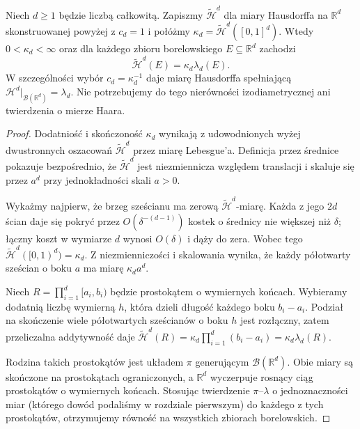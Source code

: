 \begin{twierdzenie}
\label{thm:hausdorff-calibration-26}
Niech $d\ge1$ będzie liczbą całkowitą. Zapiszmy
$\widetilde{\mathcal H}^{d}$ dla miary Hausdorffa
na $\mathbb R^d$ skonstruowanej powyżej z $c_d=1$
i połóżmy $\kappa_d=\widetilde{\mathcal H}^{d}([0,1]^d)$.
Wtedy $0<\kappa_d<\infty$ oraz dla każdego
zbioru borelowskiego $E\subseteq\mathbb R^d$
zachodzi
\[
 \widetilde{\mathcal H}^{d}(E)=\kappa_d\lambda_d(E).
\]
W szczególności wybór $c_d=\kappa_d^{-1}$ daje
miarę Hausdorffa spełniającą
$\mathcal H^d|_{\mathcal B(\mathbb R^d)}=\lambda_d$.
Nie potrzebujemy do tego nierówności izodiametrycznej
ani twierdzenia o mierze Haara.
\end{twierdzenie}
\begin{proof}
Dodatniość i skończoność $\kappa_d$ wynikają z
udowodnionych wyżej dwustronnych oszacowań
$\widetilde{\mathcal H}^{d}$ przez miarę Lebesgue'a.
Definicja przez średnice pokazuje bezpośrednio,
że $\widetilde{\mathcal H}^{d}$ jest niezmiennicza
względem translacji i skaluje się przez $a^d$
przy jednokładności skali $a>0$.

Wykażmy najpierw, że brzeg sześcianu ma zerową
$\widetilde{\mathcal H}^{d}$-miarę.
Każda z jego $2d$ ścian daje się pokryć przez
$O(\delta^{-(d-1)})$ kostek o średnicy nie większej
niż $\delta$; łączny koszt w wymiarze $d$ wynosi
$O(\delta)$ i dąży do zera. Wobec tego
$\widetilde{\mathcal H}^{d}([0,1)^d)=\kappa_d$.
Z niezmienniczości i skalowania wynika, że każdy
półotwarty sześcian o boku $a$ ma miarę
$\kappa_da^d$.

Niech $R=\prod_{i=1}^d[a_i,b_i)$ będzie
prostokątem o wymiernych końcach.
Wybieramy dodatnią liczbę wymierną $h$, która
dzieli długość każdego boku $b_i-a_i$.
Podział na skończenie wiele półotwartych sześcianów
o boku $h$ jest rozłączny, zatem przeliczalna
addytywność daje
$\widetilde{\mathcal H}^{d}(R)
=\kappa_d\prod_{i=1}^d(b_i-a_i)
=\kappa_d\lambda_d(R)$.

Rodzina takich prostokątów jest układem $\pi$
generującym $\mathcal B(\mathbb R^d)$.
Obie miary są skończone na prostokątach ograniczonych,
a $\mathbb R^d$ wyczerpuje rosnący ciąg prostokątów
o wymiernych końcach. Stosując twierdzenie
$\pi$--$\lambda$ o jednoznaczności miar (którego
dowód podaliśmy w rozdziale pierwszym) do
każdego z tych prostokątów, otrzymujemy równość
na wszystkich zbiorach borelowskich.
\end{proof}

